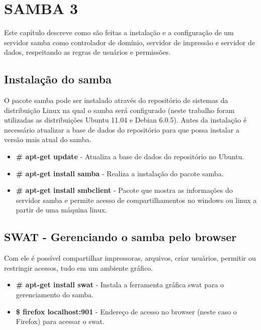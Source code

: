\chapter{SAMBA 3}
Este capítulo descreve como são feitas a instalação e a configuração de um servidor samba como controlador de domínio, servidor de impressão e servidor de dados, respeitando as regras de usuários e permissões.

\section{Instalação do samba}


O pacote samba pode ser instalado através do repositório de sistemas da distribuição Linux na qual o samba será configurado (neste trabalho foram utilizadas as distribuições Ubuntu 11.04 e Debian 6.0.5). Antes da instalação é necessário atualizar a base de dados do repositório para que possa instalar a versão mais atual do samba.

\begin{itemize}
    \item \textbf{\# apt-get update} - Atualiza a base de dados do repositório no Ubuntu.
    \item \textbf{\# apt-get install samba} - Realiza a instalação do pacote samba.
    \item \textbf{\# apt-get install smbclient} - Pacote que mostra as informações do servidor samba e permite acesso de compartilhamentos no windows ou linux a partir de uma máquina linux.
\end{itemize}

\section{SWAT - Gerenciando o samba pelo browser}

Com ele é possível compartilhar impressoras, arquivos, criar usuários, permitir ou restringir acessos, tudo em um ambiente gráfico.

\begin{itemize}
 \item \textbf{\# apt-get install swat} - Instala a ferramenta gráfica swat para o gerenciamento do samba.
    \item \textbf{\$ firefox localhost:901} - Endereço de acesso no browser (neste caso o Firefox) para acessar o swat.
\end{itemize}

